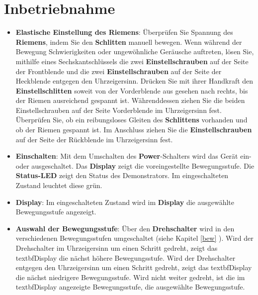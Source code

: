 %
%

\chapter{Inbetriebnahme}

\begin{itemize} \label{STU}
	
	\item \textbf{Elastische Einstellung des Riemens}: Überprüfen Sie Spannung des \textbf{Riemens}, indem Sie den \textbf{Schlitten} manuell bewegen. Wenn während der Bewegung Schwierigkeiten oder ungewöhnliche Geräusche auftreten, lösen Sie, mithilfe eines Sechskantschlüssels die zwei \textbf{Einstellschrauben} auf der Seite der Frontblende und die zwei \textbf{Einstellschrauben} auf der Seite der Heckblende entgegen den Uhrzeigersinn. Drücken Sie mit ihrer Handkraft den \textbf{Einstellschlitten} soweit von der Vorderblende aus gesehen nach rechts, bis der Riemen ausreichend gespannt ist. Währenddessen ziehen Sie die beiden Einstellschrauben auf der Seite Vorderblende im Uhrzeigersinn fest. Überprüfen Sie, ob ein reibungsloses Gleiten des \textbf{Schlittens} vorhanden und ob der Riemen gespannt ist. Im Anschluss ziehen Sie die \textbf{Einstellschrauben} auf der Seite der Rückblende im Uhrzeigersinn fest. 
	
	\item \textbf{Einschalten}: Mit dem Umschalten des \textbf{Power}-Schalters wird das Gerät ein- oder ausgeschaltet. Das \textbf{Display} zeigt die voreingestellte Bewegungsstufe. Die \textbf{Status-LED} zeigt den Status des Demonstrators. Im eingeschalteten Zustand leuchtet diese grün.
	
	\item \textbf{Display}:  Im eingeschalteten Zustand wird im \textbf{Display} die ausgewählte Bewegungsstufe angezeigt.

	
	\item \textbf{Auswahl der Bewegungsstufe}: Über den \textbf{Drehschalter} wird in den verschiedenen Bewegungsstufen umgeschaltet (siehe Kapitel \ref{bew} ). Wird der Drehschalter im Uhrzeigersinn um einen Schritt gedreht, zeigt das textbf{Display} die nächst höhere Bewegungsstufe. Wird der Drehschalter entgegen den Uhrzeigersinn um einen Schritt gedreht, zeigt das textbf{Display} die nächst niedrigere Bewegungsstufe. Wird nicht weiter gedreht, ist die im textbf{Display} angezeigte Bewegungsstufe, die ausgewählte Bewegungsstufe.
	

\end{itemize}

